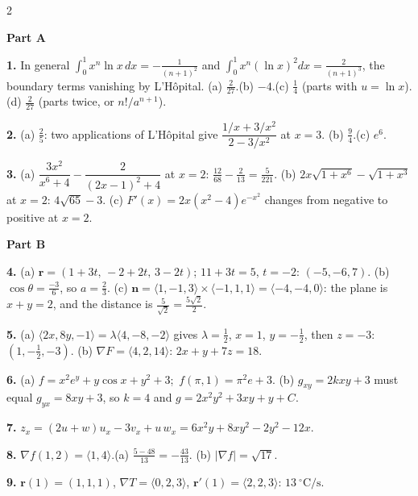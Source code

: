 \documentclass[11pt,oneside]{article}
\newcommand{\br}{\mathbf{r}}
\newcommand{\bn}{\mathbf{n}}
\newcommand{\grad}{\nabla}
\begin{document}
{\fontsize{8.8}{11}\selectfont
\setlength{\columnsep}{22pt}
\setlength{\parskip}{3.5pt}
\begin{multicols}{2}
\raggedright

\textbf{Part A}\par\vspace{2pt}

\textbf{1.} In general $\int_0^1x^{n}\ln x\,dx=-\frac{1}{(n+1)^{2}}$ and
$\int_0^1x^{n}(\ln x)^{2}dx=\frac{2}{(n+1)^{3}}$, the boundary terms vanishing by L'H\^opital.\quad
(a) $\tfrac{2}{27}$.\quad (b) $-4$.\quad (c) $\tfrac14$ (parts with $u=\ln x$).\quad
(d) $\tfrac{2}{27}$ (parts twice, or $n!/a^{n+1}$).

\textbf{2.} (a) $\tfrac25$: two applications of L'H\^opital give
$\dfrac{1/x+3/x^{2}}{2-3/x^{2}}$ at $x=3$.\quad
(b) $\tfrac94$.\quad (c) $e^{6}$.

\textbf{3.} (a) $\dfrac{3x^{2}}{x^{6}+4}-\dfrac{2}{(2x-1)^{2}+4}$ at $x=2$:
$\tfrac{12}{68}-\tfrac{2}{13}=\tfrac{5}{221}$.\quad
(b) $2x\sqrt{1+x^{6}}-\sqrt{1+x^{3}}$ at $x=2$: $4\sqrt{65}-3$.\quad
(c) $F'(x)=2x\left(x^{2}-4\right)e^{-x^{2}}$ changes from negative to positive at $x=2$.

\vspace{4pt}
\textbf{Part B}\par\vspace{2pt}

\textbf{4.} (a) $\br=(1+3t,\,-2+2t,\,3-2t)$; $11+3t=5$, $t=-2$: $(-5,-6,7)$.\quad
(b) $\cos\theta=\tfrac{-3}{6}$, so $a=\tfrac23$.\quad
(c) $\bn=\langle1,-1,3\rangle\times\langle-1,1,1\rangle=\langle-4,-4,0\rangle$: the plane is
$x+y=2$, and the distance is $\tfrac{5}{\sqrt2}=\tfrac{5\sqrt2}{2}$.

\textbf{5.} (a) $\langle2x,8y,-1\rangle=\lambda\langle4,-8,-2\rangle$ gives
$\lambda=\tfrac12$, $x=1$, $y=-\tfrac12$, then $z=-3$: $\left(1,-\tfrac12,-3\right)$.\quad
(b) $\grad F=\langle4,2,14\rangle$: $2x+y+7z=18$.

\textbf{6.} (a) $f=x^{2}e^{y}+y\cos x+y^{2}+3$;\ $f(\pi,1)=\pi^{2}e+3$.\quad
(b) $g_{xy}=2kxy+3$ must equal $g_{yx}=8xy+3$, so $k=4$ and
$g=2x^{2}y^{2}+3xy+y+C$.

\textbf{7.} $z_x=(2u+w)u_x-3v_x+u\,w_x=6x^{2}y+8xy^{2}-2y^{2}-12x$.

\textbf{8.} $\grad f(1,2)=\langle1,4\rangle$.\quad (a) $\tfrac{5-48}{13}=-\tfrac{43}{13}$.\quad
(b) $|\grad f|=\sqrt{17}$.

\textbf{9.} $\br(1)=(1,1,1)$, $\grad T=\langle0,2,3\rangle$, $\br'(1)=\langle2,2,3\rangle$:
$13\ {}^{\circ}\mathrm{C/s}$.


\end{multicols}}
\end{document}
